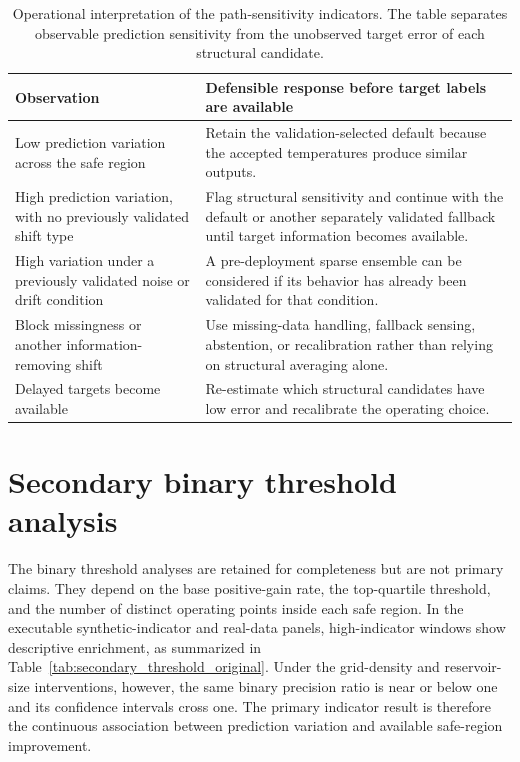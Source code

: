 \documentclass[preprint,12pt,authoryear]{elsarticle}
\begin{document}
\begin{table}[H]
\centering
\caption{Operational interpretation of the path-sensitivity indicators. The table separates observable prediction sensitivity from the unobserved target error of each structural candidate.}
\label{tab:operational_interpretation}
\footnotesize
\begin{tabularx}{\textwidth}{>{\raggedright\arraybackslash}p{}>{\raggedright\arraybackslash}X}
\toprule
Observation & Defensible response before target labels are available \\
\midrule
Low prediction variation across the safe region & Retain the validation-selected default because the accepted temperatures produce similar outputs. \\
High prediction variation, with no previously validated shift type & Flag structural sensitivity and continue with the default or another separately validated fallback until target information becomes available. \\
High variation under a previously validated noise or drift condition & A pre-deployment sparse ensemble can be considered if its behavior has already been validated for that condition. \\
Block missingness or another information-removing shift & Use missing-data handling, fallback sensing, abstention, or recalibration rather than relying on structural averaging alone. \\
Delayed targets become available & Re-estimate which structural candidates have low error and recalibrate the operating choice. \\
\bottomrule
\end{tabularx}
\end{table}

\section{Secondary binary threshold analysis}
\label{app:binary_threshold}

The binary threshold analyses are retained for completeness but are not primary claims. They depend on the base positive-gain rate, the top-quartile threshold, and the number of distinct operating points inside each safe region. In the executable synthetic-indicator and real-data panels, high-indicator windows show descriptive enrichment, as summarized in Table~\ref{tab:secondary_threshold_original}. Under the grid-density and reservoir-size interventions, however, the same binary precision ratio is near or below one and its confidence intervals cross one. The primary indicator result is therefore the continuous association between prediction variation and available safe-region improvement.
\end{document}
